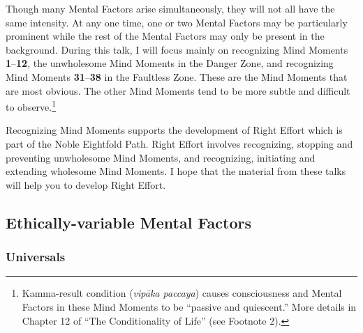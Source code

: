 Though many Mental Factors arise simultaneously, they will not all have the same intensity. At any one time, one or two Mental Factors may be particularly prominent while the rest of the Mental Factors may only be present in the background. During this talk, I will focus mainly on recognizing Mind Moments \textbf{1}--\textbf{12}, the unwholesome Mind Moments in the Danger Zone, and recognizing Mind Moments \textbf{31}--\textbf{38} in the Faultless Zone. These are the Mind Moments that are most obvious. The other Mind Moments tend to be more subtle and difficult to observe.\footnote{Kamma-result condition (\textit{vipāka paccaya}) causes consciousness and Mental Factors in these Mind Moments to be “passive and quiescent.” More details in Chapter 12 of “The Conditionality of Life” (see Footnote 2).}

Recognizing Mind Moments supports the development of Right Effort which is part of the Noble Eightfold Path. Right Effort involves recognizing, stopping and preventing unwholesome Mind Moments, and recognizing, initiating and extending wholesome Mind Moments. I hope that the material from these talks will help you to develop Right Effort.

\subsection*{Ethically-variable Mental Factors}

\subsubsection*{Universals}


